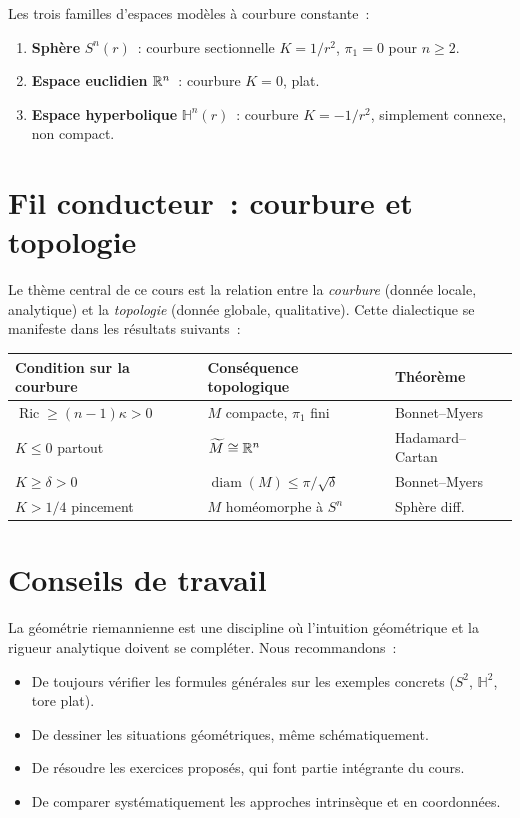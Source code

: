 \begin{formules}[title=\textbf{Espaces mod\`eles de r\'ef\'erence}]
Les trois familles d'espaces mod\`eles \`a courbure constante~:
\begin{enumerate}
    \item \textbf{Sph\`ere} $S^n(r)$~: courbure sectionnelle $K = 1/r^2$,
          $\pi_1 = 0$ pour $n \geq 2$.
    \item \textbf{Espace euclidien} $\mathbb{R}^n$~: courbure $K = 0$, plat.
    \item \textbf{Espace hyperbolique} $\mathbb{H}^n(r)$~: courbure $K = -1/r^2$,
          simplement connexe, non compact.
\end{enumerate}
\end{formules}

\section*{Fil conducteur~: courbure et topologie}

Le th\`eme central de ce cours est la relation entre la \emph{courbure} (donn\'ee
locale, analytique) et la \emph{topologie} (donn\'ee globale, qualitative). Cette
dialectique se manifeste dans les r\'esultats suivants~:

\begin{center}
\renewcommand{\arraystretch}{1.3}
\begin{tabular}{lll}
\hline
\textbf{Condition sur la courbure} & \textbf{Cons\'equence topologique} & \textbf{Th\'eor\`eme} \\
\hline
$\operatorname{Ric} \geq (n-1)\kappa > 0$ & $M$ compacte, $\pi_1$ fini & Bonnet--Myers \\
$K \leq 0$ partout & $\widetilde{M} \cong \mathbb{R}^n$ & Hadamard--Cartan \\
$K \geq \delta > 0$ & $\operatorname{diam}(M) \leq \pi/\sqrt{\delta}$ & Bonnet--Myers \\
$K > 1/4$ pincement & $M$ hom\'eomorphe \`a $S^n$ & Sph\`ere diff.\\
\hline
\end{tabular}
\end{center}

\section*{Conseils de travail}

La g\'eom\'etrie riemannienne est une discipline o\`u l'intuition g\'eom\'etrique et la
rigueur analytique doivent se compl\'eter. Nous recommandons~:
\begin{itemize}
    \item De toujours v\'erifier les formules g\'en\'erales sur les exemples concrets
          ($S^2$, $\mathbb{H}^2$, tore plat).
    \item De dessiner les situations g\'eom\'etriques, m\^eme schématiquement.
    \item De r\'esoudre les exercices propos\'es, qui font partie int\'egrante du cours.
    \item De comparer syst\'ematiquement les approches intrins\`eque et en coordonn\'ees.
\end{itemize}

